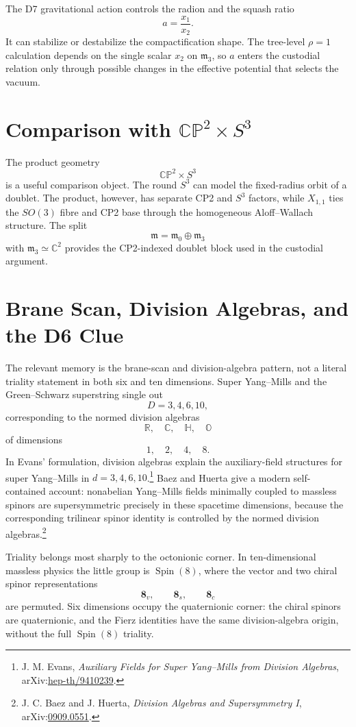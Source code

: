 \documentclass[11pt]{article}
\newcommand{\CP}{\mathbb{CP}}
\newcommand{\RR}{\mathbb{R}}
\newcommand{\CC}{\mathbb{C}}
\newcommand{\HH}{\mathbb{H}}
\newcommand{\mzero}{\mathfrak m_0}
\newcommand{\mthree}{\mathfrak m_3}
\begin{document}
The D7 gravitational action controls the radion and the squash ratio
\[
a=\frac{x_1}{x_2}.
\]
It can stabilize or destabilize the compactification shape.  The tree-level
\(\rho=1\) calculation depends on the single scalar \(x_2\) on \(\mthree\),
so \(a\) enters the custodial relation only through possible changes in the
effective potential that selects the vacuum.

\section{Comparison with \texorpdfstring{$\CP^2\times S^3$}{CP2 x S3}}

The product geometry
\[
\CP^2\times S^3
\]
is a useful comparison object.  The round \(S^3\) can model the fixed-radius
orbit of a doublet.  The product, however, has separate CP2 and \(S^3\)
factors, while \(X_{1,1}\) ties the \(SO(3)\) fibre and CP2 base through the
homogeneous Aloff--Wallach structure.  The split
\[
\mathfrak m=\mzero\oplus\mthree
\]
with \(\mthree\simeq\CC^2\) provides the CP2-indexed doublet block used in
the custodial argument.

\section{Brane Scan, Division Algebras, and the D6 Clue}

The relevant memory is the brane-scan and division-algebra pattern, not a
literal triality statement in both six and ten dimensions.  Super Yang--Mills
and the Green--Schwarz superstring single out
\[
D=3,4,6,10,
\]
corresponding to the normed division algebras
\[
\RR,\quad \CC,\quad \HH,\quad \mathbb O
\]
of dimensions
\[
1,\quad 2,\quad 4,\quad 8 .
\]
In Evans' formulation, division algebras explain the auxiliary-field
structures for super Yang--Mills in \(d=3,4,6,10\).\footnote{J. M. Evans,
\emph{Auxiliary Fields for Super Yang--Mills from Division Algebras},
arXiv:\href{https://arxiv.org/abs/hep-th/9410239}{hep-th/9410239}.}
Baez and Huerta give a modern self-contained account: nonabelian
Yang--Mills fields minimally coupled to massless spinors are supersymmetric
precisely in these spacetime dimensions, because the corresponding
trilinear spinor identity is controlled by the normed division
algebras.\footnote{J. C. Baez and J. Huerta,
\emph{Division Algebras and Supersymmetry I},
arXiv:\href{https://arxiv.org/abs/0909.0551}{0909.0551}.}

Triality belongs most sharply to the octonionic corner.  In ten-dimensional
massless physics the little group is \(\operatorname{Spin}(8)\), where the
vector and two chiral spinor representations
\[
\mathbf 8_v,\qquad \mathbf 8_s,\qquad \mathbf 8_c
\]
are permuted.  Six dimensions occupy the quaternionic corner: the chiral
spinors are quaternionic, and the Fierz identities have the same
division-algebra origin, without the full \(\operatorname{Spin}(8)\)
triality.
\end{document}
